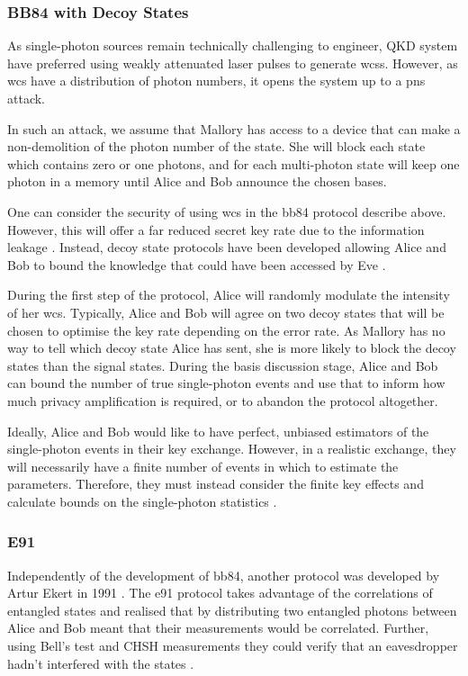 \subsubsection*{BB84 with Decoy States}

As single-photon sources remain technically challenging to engineer, \ac{QKD} system have preferred using weakly attenuated laser pulses to generate \acp{wcs}. However, as \ac{wcs} have a distribution of photon numbers, it opens the system up to a \ac{pns} attack. 

In such an attack, we assume that Mallory has access to a device that can make a non-demolition of the photon number of the state. She will block each state which contains zero or one photons, and for each multi-photon state will keep one photon in a memory until Alice and Bob announce the chosen bases. 

One can consider the security of using \ac{wcs} in the \ac{bb84} protocol describe above. However, this will offer a far reduced secret key rate due to the information leakage \cite{Norbert2000Security, Brassard2000Limitations}. Instead, decoy state protocols have been developed allowing Alice and Bob to bound the knowledge that could have been accessed by Eve \cite{Lo2005}. 

During the first step of the protocol, Alice will randomly modulate the intensity of her \ac{wcs}. Typically, Alice and Bob will agree on two decoy states that will be chosen to optimise the key rate depending on the error rate. As Mallory has no way to tell which decoy state Alice has sent, she is more likely to block the decoy states than the signal states. During the basis discussion stage, Alice and Bob can bound the number of true single-photon events and use that to inform how much privacy amplification is required, or to abandon the protocol altogether.

Ideally, Alice and Bob would like to have perfect, unbiased estimators of the single-photon events in their key exchange. However, in a realistic exchange, they will necessarily have a finite number of events in which to estimate the parameters. Therefore, they must instead consider the finite key effects and calculate bounds on the single-photon statistics \cite{gottesman2004security}. 

\subsubsection*{E91}

Independently of the development of \ac{bb84}, another protocol was developed by Artur Ekert in 1991 \cite{E91}. The \ac{e91} protocol takes advantage of the correlations of entangled states and realised that by distributing two entangled photons between Alice and Bob meant that their measurements would be correlated. Further, using Bell's test and CHSH measurements they could verify that an eavesdropper hadn't interfered with the states \cite{Bell1964Einstein, CHSH}. 

